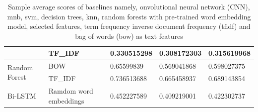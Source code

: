 \begin{table}[h!]
{\begin{tabular}{@{}lllll@{}}
\multicolumn{1}{|l|}{} &
  \multicolumn{1}{l|}{TF\_IDF} &
  \multicolumn{1}{l|}{0.330515298} &
  \multicolumn{1}{l|}{0.308172303} &
  \multicolumn{1}{l|}{0.315619968} \\ \midrule
\multicolumn{1}{|l|}{\multirow{2}{*}{Random Forest}} &
  \multicolumn{1}{l|}{BOW} &
  \multicolumn{1}{l|}{0.65599839} &
  \multicolumn{1}{l|}{0.569041868} &
  \multicolumn{1}{l|}{0.598027375} \\ \cmidrule(l){2-5} 
\multicolumn{1}{|l|}{} &
  \multicolumn{1}{l|}{TF\_IDF} &
  \multicolumn{1}{l|}{0.736513688} &
  \multicolumn{1}{l|}{0.665458937} &
  \multicolumn{1}{l|}{0.689143854} \\ \midrule
\multicolumn{1}{|l|}{Bi-LSTM} &
  \multicolumn{1}{l|}{Ramdom word embeddings} &
  \multicolumn{1}{l|}{0.452227589} &
  \multicolumn{1}{l|}{0.409219001} &
  \multicolumn{1}{l|}{0.422302737} \\ \bottomrule
\end{tabular}%
}

\caption{Sample average scores of baselines namely, onvolutional neural network (CNN), \acrfull{mnb}, \acrfull{svm}, decision trees, \acrfull{knn}, random forests with pre-trained word embedding model, selected features, term frequency inverse document frequency (\acrshort{tfidf}) and bag of words (\acrshort{bow}) as text features}
\label{tab:Sample average scores baselines}
\end{table}

